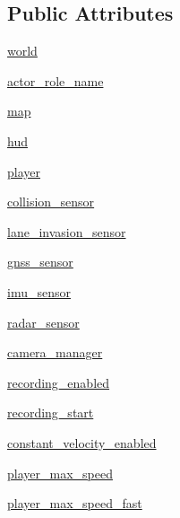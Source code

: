 \subsection*{Public Attributes}
\begin{DoxyCompactItemize}
\item 
\hyperlink{classimplementation_1_1manual__control_1_1_world_ad4388bad379f9b9d2ede30b07f4b777c}{world}
\item 
\hyperlink{classimplementation_1_1manual__control_1_1_world_a2f8aa6d7ef36251949ffe8d412b85001}{actor\+\_\+role\+\_\+name}
\item 
\hyperlink{classimplementation_1_1manual__control_1_1_world_ab7fbad14f277cfa9e57e63a3196aa011}{map}
\item 
\hyperlink{classimplementation_1_1manual__control_1_1_world_a6d64507eaf864aa44077eecde0802a13}{hud}
\item 
\hyperlink{classimplementation_1_1manual__control_1_1_world_a4612d6b4d526568216dfb2e249b0cbe8}{player}
\item 
\hyperlink{classimplementation_1_1manual__control_1_1_world_afbae522d11f4e47482319986d42ac9fc}{collision\+\_\+sensor}
\item 
\hyperlink{classimplementation_1_1manual__control_1_1_world_a6389c573dca87fe086be63fbd1e3229c}{lane\+\_\+invasion\+\_\+sensor}
\item 
\hyperlink{classimplementation_1_1manual__control_1_1_world_a1a5f584eea1f1a872ecf45c823d38f6d}{gnss\+\_\+sensor}
\item 
\hyperlink{classimplementation_1_1manual__control_1_1_world_a2aec833125a21d7fce7c3b80f129384a}{imu\+\_\+sensor}
\item 
\hyperlink{classimplementation_1_1manual__control_1_1_world_ab4c4a44a5de966feb490f8dab96a1eff}{radar\+\_\+sensor}
\item 
\hyperlink{classimplementation_1_1manual__control_1_1_world_a1fdd1ea2c7783b8a6cc60db16a45bc0c}{camera\+\_\+manager}
\item 
\hyperlink{classimplementation_1_1manual__control_1_1_world_a71e3a093dc3ae0c30da36b7a5aded009}{recording\+\_\+enabled}
\item 
\hyperlink{classimplementation_1_1manual__control_1_1_world_a5dbfd6dec562a0ecf27618306be0533f}{recording\+\_\+start}
\item 
\hyperlink{classimplementation_1_1manual__control_1_1_world_a0e3cf94f91530780732f016bc3097bb1}{constant\+\_\+velocity\+\_\+enabled}
\item 
\hyperlink{classimplementation_1_1manual__control_1_1_world_af411ede3b70541e5ee4d0c06ac2f91b5}{player\+\_\+max\+\_\+speed}
\item 
\hyperlink{classimplementation_1_1manual__control_1_1_world_adaf089038e4e0f4d93fff6f72cbe0846}{player\+\_\+max\+\_\+speed\+\_\+fast}
\end{DoxyCompactItemize}


